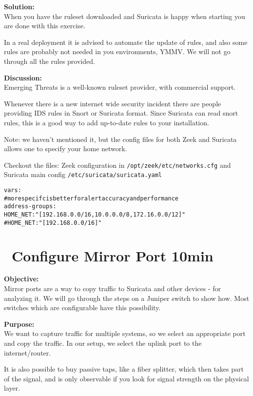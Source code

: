 \documentclass[a4paper,11pt,notitlepage]{report}
\begin{document}
{\bf Solution:}\\
When you have the ruleset downloaded and Suricata is happy when starting you are done with this exercise.

In a real deployment it is advised to automate the update of rules, and also some rules are probably not needed in you environments, YMMV. We will not go through all the rules provided.

{\bf Discussion:}\\
Emerging Threats is a well-known ruleset provider, with commercial support.

Whenever there is a new internet wide security incident there are people providing IDS rules in Snort or Suricata format. Since Suricata can read snort rules, this is a good way to add up-to-date rules to your installation.

Note: we haven't mentioned it, but the config files for both Zeek and Suricata allows one to specify your home network.

Checkout the files: Zeek configuration in \verb+/opt/zeek/etc/networks.cfg+ and Suricata main config \verb+/etc/suricata/suricata.yaml+


\begin{alltt}\small
vars:
  # more specifc is better for alert accuracy and performance
  address-groups:
    HOME_NET: "[192.168.0.0/16,10.0.0.0/8,172.16.0.0/12]"
    #HOME_NET: "[192.168.0.0/16]"
\end{alltt}

\chapter{\faExclamationTriangle\ Configure Mirror Port 10min}
\label{ex:mirrorport}


{\bf Objective:} \\
Mirror ports are a way to copy traffic to Suricata and other devices - for analyzing it. We will go through the steps on a Juniper switch to show how.
Most switches which are configurable have this possibility.


{\bf Purpose:}\\
We want to capture traffic for multiple systems, so we select an appropriate port and copy the traffic. In our setup, we select the uplink port to the internet/router.

It is also possible to buy passive taps, like a fiber splitter, which then takes part of the signal, and is only observable if you look for signal strength on the physical layer.
\end{document}
